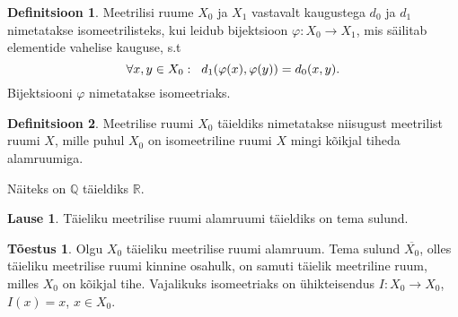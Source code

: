 \documentclass{article}[12pt]
\newcommand{\h}{\hspace{0.2cm}}
\newcommand{\R}{\mathbb{R}}
\newcommand{\Q}{\mathbb{Q}}
\theoremstyle{definition}
\newtheorem{definition}{Definitsioon}[section]
\theoremstyle{definition}
\theoremstyle{definition}
\newtheorem{lause}{Lause}[section]
\theoremstyle{break}
\newtheorem*{toestus}{Tõestus}
\begin{document}
\begin{definition}
	Meetrilisi ruume $X_0$ ja $X_1$ vastavalt kaugustega $d_0$ ja $d_1$ nimetatakse isomeetrilisteks, kui leidub bijektsioon $\varphi : X_0\rightarrow X_1$, mis säilitab elementide vahelise kauguse, s.t
	\[
		\forall x,y\in X_0: \h d_1(\varphi(x),\varphi(y)) = d_0(x,y).
	\]
	Bijektsiooni $\varphi$ nimetatakse isomeetriaks.
\end{definition}

\begin{definition}
	Meetrilise ruumi $X_0$ täieldiks nimetatakse niisugust meetrilist ruumi $X$, mille puhul $X_0$ on isomeetriline ruumi $X$ mingi kõikjal tiheda alamruumiga.
\end{definition}

Näiteks on $\Q$ täieldiks $\R$.

\begin{lause}
	Täieliku meetrilise ruumi alamruumi täieldiks on tema sulund.
\end{lause}

\begin{toestus}
	Olgu $X_0$ täieliku meetrilise ruumi alamruum. 
	Tema sulund $\overline{X_0}$, olles täieliku meetrilise ruumi kinnine osahulk, on samuti täielik meetriline ruum, milles $X_0$ on kõikjal tihe.
	Vajalikuks isomeetriaks on ühikteisendus $I:X_0\rightarrow X_0$, $I(x) = x$, $x\in X_0$.
\end{toestus}
\end{document}
